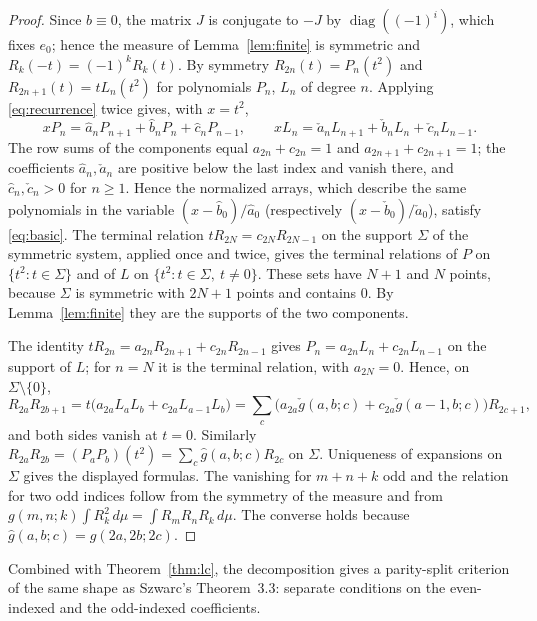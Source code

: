 \begin{proof}
Since $b\equiv0$, the matrix $J$ is conjugate to $-J$ by $\operatorname{diag}((-1)^i)$, which fixes $e_0$; hence the measure of Lemma~\ref{lem:finite} is symmetric and $R_k(-t)=(-1)^kR_k(t)$. By symmetry $R_{2n}(t)=P_n(t^2)$ and $R_{2n+1}(t)=tL_n(t^2)$ for polynomials $P_n$, $L_n$ of degree $n$. Applying \eqref{eq:recurrence} twice gives, with $x=t^2$,
\[
xP_n=\hat a_nP_{n+1}+\hat b_nP_n+\hat c_nP_{n-1},\qquad
xL_n=\check a_nL_{n+1}+\check b_nL_n+\check c_nL_{n-1}.
\]
The row sums of the components equal $a_{2n}+c_{2n}=1$ and $a_{2n+1}+c_{2n+1}=1$; the coefficients $\hat a_n,\check a_n$ are positive below the last index and vanish there, and $\hat c_n,\check c_n>0$ for $n\geq1$. Hence the normalized arrays, which describe the same polynomials in the variable $(x-\hat b_0)/\hat a_0$ (respectively $(x-\check b_0)/\check a_0$), satisfy \eqref{eq:basic}. The terminal relation $tR_{2N}=c_{2N}R_{2N-1}$ on the support $\Sigma$ of the symmetric system, applied once and twice, gives the terminal relations of $P$ on $\{t^2:t\in\Sigma\}$ and of $L$ on $\{t^2:t\in\Sigma,\ t\neq0\}$. These sets have $N+1$ and $N$ points, because $\Sigma$ is symmetric with $2N+1$ points and contains $0$. By Lemma~\ref{lem:finite} they are the supports of the two components.

The identity $tR_{2n}=a_{2n}R_{2n+1}+c_{2n}R_{2n-1}$ gives $P_n=a_{2n}L_n+c_{2n}L_{n-1}$ on the support of $L$; for $n=N$ it is the terminal relation, with $a_{2N}=0$. Hence, on $\Sigma\setminus\{0\}$,
\[
R_{2a}R_{2b+1}=t\big(a_{2a}L_aL_b+c_{2a}L_{a-1}L_b\big)=\sum_c\big(a_{2a}\check g(a,b;c)+c_{2a}\check g(a-1,b;c)\big)R_{2c+1},
\]
and both sides vanish at $t=0$. Similarly $R_{2a}R_{2b}=(P_aP_b)(t^2)=\sum_c\hat g(a,b;c)R_{2c}$ on $\Sigma$. Uniqueness of expansions on $\Sigma$ gives the displayed formulas. The vanishing for $m+n+k$ odd and the relation for two odd indices follow from the symmetry of the measure and from $g(m,n;k)\int R_k^2\,d\mu=\int R_mR_nR_k\,d\mu$. The converse holds because $\hat g(a,b;c)=g(2a,2b;2c)$.
\end{proof}

Combined with Theorem~\ref{thm:lc}, the decomposition gives a parity-split criterion of the same shape as Szwarc's Theorem~3.3: separate conditions on the even-indexed and the odd-indexed coefficients.

